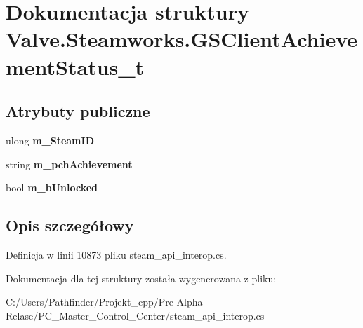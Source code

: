 \hypertarget{struct_valve_1_1_steamworks_1_1_g_s_client_achievement_status__t}{}\section{Dokumentacja struktury Valve.\+Steamworks.\+G\+S\+Client\+Achievement\+Status\+\_\+t}
\label{struct_valve_1_1_steamworks_1_1_g_s_client_achievement_status__t}
\subsection*{Atrybuty publiczne}
\begin{DoxyCompactItemize}
\item 
\mbox{\label{struct_valve_1_1_steamworks_1_1_g_s_client_achievement_status__t_af32b235a06208c3653aedbffd0b9bcaf}} 
ulong {\bfseries m\+\_\+\+Steam\+ID}
\item 
\mbox{\label{struct_valve_1_1_steamworks_1_1_g_s_client_achievement_status__t_a0bc5638be6e327ed62cc671a3c637f58}} 
string {\bfseries m\+\_\+pch\+Achievement}
\item 
\mbox{\label{struct_valve_1_1_steamworks_1_1_g_s_client_achievement_status__t_a7d5dc53a9d6c0f3d848c635e00d8f33b}} 
bool {\bfseries m\+\_\+b\+Unlocked}
\end{DoxyCompactItemize}


\subsection{Opis szczegółowy}


Definicja w linii 10873 pliku steam\+\_\+api\+\_\+interop.\+cs.



Dokumentacja dla tej struktury została wygenerowana z pliku\+:\begin{DoxyCompactItemize}
\item 
C\+:/\+Users/\+Pathfinder/\+Projekt\+\_\+cpp/\+Pre-\/\+Alpha Relase/\+P\+C\+\_\+\+Master\+\_\+\+Control\+\_\+\+Center/steam\+\_\+api\+\_\+interop.\+cs\end{DoxyCompactItemize}
